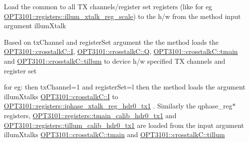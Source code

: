 \begin{DoxyItemize}
\item Load the common to all TX channels/register set registers (like for eg \mbox{\hyperlink{class_o_p_t3101_1_1registers_a92394965d2a4ebd5a540ae43a9a19403}{O\+P\+T3101\+::registers\+::illum\+\_\+xtalk\+\_\+reg\+\_\+scale}}) to the h/w from the method input argument illum\+Xtalk
\item Based on tx\+Channel and register\+Set argument the the method loads the \mbox{\hyperlink{class_o_p_t3101_1_1crosstalk_c_a97152b209288a0dc30c4158fdc1815fc}{O\+P\+T3101\+::crosstalk\+C\+::I}}, \mbox{\hyperlink{class_o_p_t3101_1_1crosstalk_c_a1e20d913baf2432ec90fe06a45c226db}{O\+P\+T3101\+::crosstalk\+C\+::Q}}, \mbox{\hyperlink{class_o_p_t3101_1_1crosstalk_c_a8b7250b531e953587c665c2c43860d82}{O\+P\+T3101\+::crosstalk\+C\+::tmain}} and \mbox{\hyperlink{class_o_p_t3101_1_1crosstalk_c_ab1d1d581f0495f5695ad49a2a8a41fd3}{O\+P\+T3101\+::crosstalk\+C\+::tillum}} to device h/w specified TX channels and register set ~\newline

\item for eg\+: then tx\+Channel=1 and register\+Set=\textquotesingle{}l\textquotesingle{} then the method loads the argument illum\+Xtalk\textquotesingle{}s \mbox{\hyperlink{class_o_p_t3101_1_1crosstalk_c_a97152b209288a0dc30c4158fdc1815fc}{O\+P\+T3101\+::crosstalk\+C\+::I}} to \mbox{\hyperlink{class_o_p_t3101_1_1registers_a897d8a5ef0a4d37b24e20276eb51a952}{O\+P\+T3101\+::registers\+::iphase\+\_\+xtalk\+\_\+reg\+\_\+hdr0\+\_\+tx1}} . Similarly the qphase\+\_\+reg$\ast$ registers, \mbox{\hyperlink{class_o_p_t3101_1_1registers_a68724aced807ba68873f5a6375bb611e}{O\+P\+T3101\+::registers\+::tmain\+\_\+calib\+\_\+hdr0\+\_\+tx1}} and \mbox{\hyperlink{class_o_p_t3101_1_1registers_aaa41e9820a7a006305ef538a8e3ac657}{O\+P\+T3101\+::registers\+::tillum\+\_\+calib\+\_\+hdr0\+\_\+tx1}} are loaded from the input argument illum\+Xtalk\textquotesingle{}s \mbox{\hyperlink{class_o_p_t3101_1_1crosstalk_c_a8b7250b531e953587c665c2c43860d82}{O\+P\+T3101\+::crosstalk\+C\+::tmain}} and \mbox{\hyperlink{class_o_p_t3101_1_1crosstalk_c_ab1d1d581f0495f5695ad49a2a8a41fd3}{O\+P\+T3101\+::crosstalk\+C\+::tillum}} 
\end{DoxyItemize}\mbox{\label{class_o_p_t3101_1_1device_a48b320dfe4376bf62043d10ba937e8cd}} 
